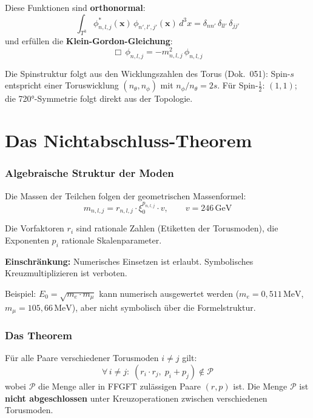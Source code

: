 Diese Funktionen sind \textbf{orthonormal}:
\begin{equation}
  \int_{T^3} \phi_{n,l,j}^*(\mathbf{x})\,\phi_{n',l',j'}(\mathbf{x})\,d^3x
  = \delta_{nn'}\,\delta_{ll'}\,\delta_{jj'}
\end{equation}
und erfüllen die \textbf{Klein-Gordon-Gleichung}:
\begin{equation}
  \Box\,\phi_{n,l,j} = -m_{n,l,j}^2\,\phi_{n,l,j}
\end{equation}

Die Spinstruktur folgt aus den Wicklungszahlen des Torus (Dok.~051):
Spin-$s$ entspricht einer Toruswicklung $(n_\theta, n_\phi)$ mit
$n_\phi/n_\theta = 2s$. Für Spin-$\tfrac{1}{2}$: $(1,1)$; die
720°-Symmetrie folgt direkt aus der Topologie.

\part{Das Nichtabschluss-Theorem}

\section{Algebraische Struktur der Moden}

Die Massen der Teilchen folgen der geometrischen Massenformel:
\begin{equation}
  m_{n,l,j} = r_{n,l,j} \cdot \xi_0^{p_{n,l,j}} \cdot v,
  \qquad v = 246\,\text{GeV}
  \label{eq:massenformel}
\end{equation}

Die Vorfaktoren $r_i$ sind rationale Zahlen (Etiketten der Torusmoden),
die Exponenten $p_i$ rationale Skalenparameter.

\textbf{Einschränkung:} Numerisches Einsetzen ist erlaubt.
Symbolisches Kreuzmultiplizieren ist verboten.

Beispiel: $E_0 = \sqrt{m_e \cdot m_\mu}$ kann numerisch ausgewertet
werden ($m_e = 0{,}511\,\text{MeV}$, $m_\mu = 105{,}66\,\text{MeV}$),
aber nicht symbolisch über die Formelstruktur.

\section{Das Theorem}

\begin{tcolorbox}[colback=blue!5, colframe=blue!60!black, boxrule=0.8pt,
  arc=3pt, left=4mm, right=4mm,
  title={Nichtabschluss-Theorem der FFGFT-Torusmoden}]
Für alle Paare verschiedener Torusmoden $i \neq j$ gilt:
\[
  \forall\, i \neq j:\;
  (r_i \cdot r_j,\; p_i + p_j) \notin \mathcal{P}
\]
wobei $\mathcal{P}$ die Menge aller in FFGFT zulässigen Paare
$(r,p)$ ist. Die Menge $\mathcal{P}$ ist \textbf{nicht abgeschlossen}
unter Kreuzoperationen zwischen verschiedenen Torusmoden.
\end{tcolorbox}

